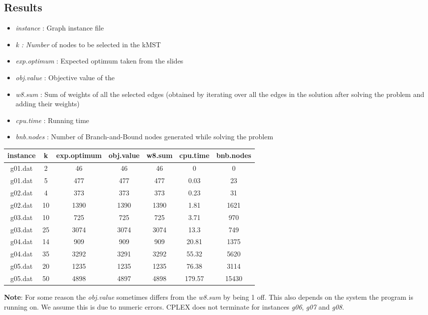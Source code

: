 \subsection{Results} \label{4:4}

\begin{itemize}
	\item \textit{instance} : Graph instance file
	\item \textit{k : Number} of nodes to be selected in the kMST
	\item \textit{exp.optimum} : Expected optimum taken from the slides
	\item \textit{obj.value} : Objective value of the 
	\item \textit{w8.sum} : Sum of weights of all the selected edges (obtained by iterating over all the edges in the solution after solving the problem and adding their weights)
	\item \textit{cpu.time} : Running time
	\item \textit{bnb.nodes} : Number of Branch-and-Bound nodes generated while solving the problem
\end{itemize}

\begin{tabular}{ c | c | c | c | c | c | c }
	instance & k & exp.optimum & obj.value & w8.sum & cpu.time & bnb.nodes \\ 
	\hline
	g01.dat & 2 & 46 & 46 & 46 & 0 & 0 \\
	g01.dat & 5 & 477 & 477 & 477 & 0.03 & 23 \\
	g02.dat & 4 & 373 & 373 & 373 & 0.23 & 31 \\
	g02.dat & 10 & 1390 & 1390 & 1390 & 1.81 & 1621 \\
	g03.dat & 10 & 725 & 725 & 725 & 3.71 & 970 \\
	g03.dat & 25 & 3074 & 3074 & 3074 & 13.3 & 749 \\
	g04.dat & 14 & 909 & 909 & 909 & 20.81 & 1375 \\
	g04.dat & 35 & 3292 & 3291 & 3292 & 55.32 & 5620 \\
	g05.dat & 20 & 1235 & 1235 & 1235 & 76.38 & 3114 \\
	g05.dat & 50 & 4898 & 4897 & 4898 & 179.57 & 15430 \\
\end{tabular}

\vspace{0.5cm}

\textbf{Note}: For some reason the \textit{obj.value} sometimes differs from the \textit{w8.sum} by being 1 off. This also depends on the system the program is running on. We assume this is due to numeric errors. CPLEX does not terminate for instances \textit{g06}, \textit{g07} and \textit{g08}.
